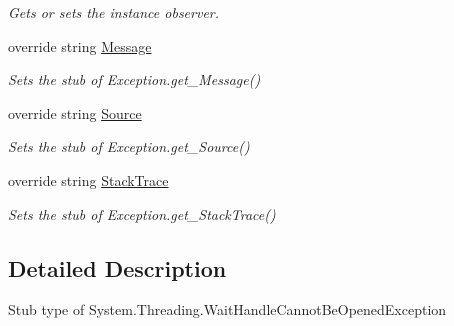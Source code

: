 \begin{DoxyCompactItemize}
\begin{DoxyCompactList}\small\item\em Gets or sets the instance observer.\end{DoxyCompactList}\item 
override string \hyperlink{class_system_1_1_threading_1_1_fakes_1_1_stub_wait_handle_cannot_be_opened_exception_a547254c7cd28d96c7db69fbdf9202c5e}{Message}
\begin{DoxyCompactList}\small\item\em Sets the stub of Exception.\-get\-\_\-\-Message()\end{DoxyCompactList}\item 
override string \hyperlink{class_system_1_1_threading_1_1_fakes_1_1_stub_wait_handle_cannot_be_opened_exception_aecb33f22e34ecd9119660a2fd4607fcb}{Source}
\begin{DoxyCompactList}\small\item\em Sets the stub of Exception.\-get\-\_\-\-Source()\end{DoxyCompactList}\item 
override string \hyperlink{class_system_1_1_threading_1_1_fakes_1_1_stub_wait_handle_cannot_be_opened_exception_aad4dcee933a0dddbc0e07e7ee620d69a}{Stack\-Trace}
\begin{DoxyCompactList}\small\item\em Sets the stub of Exception.\-get\-\_\-\-Stack\-Trace()\end{DoxyCompactList}\end{DoxyCompactItemize}


\subsection{Detailed Description}
Stub type of System.\-Threading.\-Wait\-Handle\-Cannot\-Be\-Opened\-Exception



